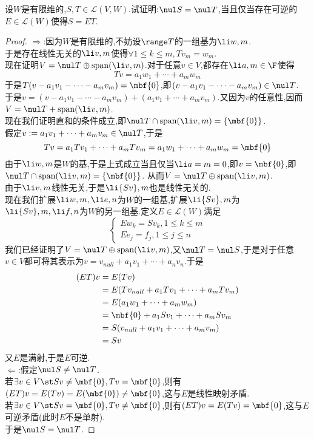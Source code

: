 \documentclass{ctexart}
\begin{document}
\begin{problem}[6.]
    设$W$是有限维的,$S,T\in\mathcal{L}(V,W)$.试证明:$\nul S=\nul T$,当且仅当存在可逆的$E\in\mathcal{L}(W)$使得$S=ET$.
\end{problem}
\begin{proof}
    $\Rightarrow$:因为$W$是有限维的,不妨设$\range T$的一组基为$\li w,m$.\\
    于是存在线性无关的$\li v,m$使得$\forall 1\leqslant k\leqslant m,Tv_m=w_m$.\\
    现在证明$V=\nul T\oplus\text{span}(\li v,m)$.对于任意$v\in V$,都存在$\li a,m\in\F$使得
    $$Tv=a_1w_1+\cdots+a_mw_m$$
    于是$T(v-a_1v_1-\cdots-a_mv_m)=\mbf{0}$,即$(v-a_1v_1-\cdots-a_mv_m)\in\nul T$.\\
    于是$v=(v-a_1v_1-\cdots-a_mv_m)+(a_1v_1+\cdots+a_mv_m)$.又因为$v$的任意性,因而$V=\nul T+\text{span}(\li v,m)$.\\
    现在我们证明直和的条件成立,即$\nul T\cap\text{span}(\li v,m)=\left\{\mbf{0}\right\}$.\\
    假定$v:=a_1v_1+\cdots+a_mv_m\in\nul T$,于是
    $$Tv=a_1Tv_1+\cdots+a_mTv_m=a_1w_1+\cdots+a_mw_m=\mbf{0}$$
    由于$\li w,m$是$W$的基,于是上式成立当且仅当$\li a=m=0$,即$v=\mbf{0}$,即$\nul T\cap\text{span}(\li v,m)=\left\{\mbf{0}\right\}$.%
    从而$V=\nul T\oplus\text{span}(\li v,m)$.\\
    由于$\li v,m$线性无关,于是$\li {Sv},m$也是线性无关的.\\
    现在我们扩展$\li w,m,\li e,n$为$W$的一组基,扩展$\li{Sv},m$为$\li{Sv},m,\li f,n$为$W$的另一组基.定义$E\in\mathcal{L}(W)$满足
    $$\left\{\begin{array}{l}
        Ew_k=Sv_k,1\leqslant k\leqslant m\\
        Ee_j=f_j,1\leqslant j\leqslant n
    \end{array}\right.$$
    我们已经证明了$V=\nul T\oplus\text{span}(\li v,m)$,又$\nul T=\nul S$,于是对于任意$v\in V$都可将其表示为$v=v_{null}+a_1v_1+\cdots+a_nv_n$.于是
    $$\begin{aligned}
        (ET)v
        &= E(Tv) \\
        &= E(Tv_{null}+a_1Tv_1+\cdots+a_mTv_m) \\
        &= E(a_1w_1+\cdots+a_mw_m) \\
        &= \mbf{0}+a_1Sv_1+\cdots+a_mSv_m \\
        &= S(v_{null}+a_1v_1+\cdots+a_mv_m) \\
        &= Sv
    \end{aligned}$$
    又$E$是满射,于是$E$可逆.\\
    $\Leftarrow$:假定$\nul S\neq\nul T$.\\
    若$\exists v\in V\st Sv\neq\mbf{0},Tv=\mbf{0}$,则有$(ET)v=E(Tv)=E(\mbf{0})\neq\mbf{0}$,这与$E$是线性映射矛盾.\\
    若$\exists v\in V\st Sv=\mbf{0},Tv\neq\mbf{0}$,则有$(ET)v=E(Tv)=\mbf{0}$,这与$E$可逆矛盾(此时$E$不是单射).\\
    于是$\nul S=\nul T$.
\end{proof}
\end{document}
